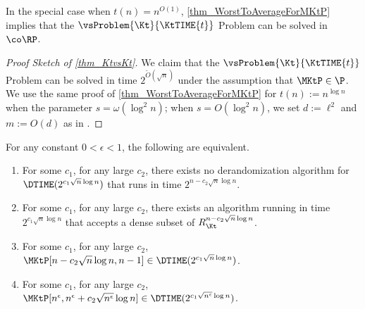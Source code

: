 \documentclass{toc}
\begin{document}
In the special case when $t(n) = n^{O(1)}$, \cref{thm_WorstToAverageForMKtP} implies that the $\vsProblem{\Kt}{\KtTIME{t}}$ Problem can be solved
in $\co\RP$.
\begin{proof}
  [Proof Sketch of \cref{thm_KtvsKt}]
  We claim that the $\vsProblem{\Kt}{\KtTIME{t}}$ Problem can be solved in
  time $2^{\widetilde{O}(\sqrt{n})}$
  under the assumption that $\MKtP \in \P$.
  We use the same proof of \cref{thm_WorstToAverageForMKtP} for $t(n) := n^{\log n}$ when the parameter $s = \omega(\log^2 n)$;
  when $s = O(\log^2 n)$, we set $d := \ell^2$ and $m := O(d)$ as in \cite{Hirahara18_focs_conf}.
\end{proof}

\begin{theorem}
  \label{thm_NontrivialDerandomizationFormal}
  For any constant $0 < \epsilon < 1$, the following are equivalent.
  \begin{enumerate}
    \item
          \label{item_NontrivialDerandomizationInTheorem}
          For some $c_1$, for any large $c_2$,
          there exists no derandomization algorithm for $\DTIME(2^{c_1 \sqrt{n} \log n})$ that runs in time $2^{n - c_2 \sqrt{n} \log n}$.
    \item
          \label{item_MKtPDenseSubset}
          For some $c_1$, for any large $c_2$,
          there exists an algorithm running in time $2^{c_1 \sqrt{n} \log n}$ that accepts a dense subset of $R_{\Kt}^{n - c_2 \sqrt{n} \log n}$.
    \item
          \label{item_MKtPLowerBoundInTheorem}
          For some $c_1$, for any large $c_2$,
          $\MKtP[n - c_2 \sqrt{n} \log n, n-1] \in \DTIME(2^{c_1 \sqrt{n} \log n})$.
    \item
          \label{item_MKtPLowerBoundSmallInTheorem}
          For some $c_1$, for any large $c_2$,
          $\MKtP[n^\epsilon, n^\epsilon + c_2 \sqrt{n^\epsilon} \log n] \in \DTIME(2^{c_1 \sqrt{n^\epsilon} \log n})$.
  \end{enumerate}
\end{theorem}
\end{document}
